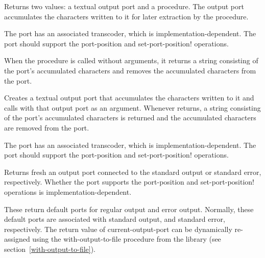 \begin{entry}{%
}

Returns two values: a textual output port and a procedure.
The output port accumulates the characters written to it for
later extraction by the procedure.

The port has an associated transcoder, which is
implementation-dependent.  The port should support the {\cf
  port-position} and {\cf set-port-position!} operations.

When the procedure is called without arguments, it returns a string consisting of the port's
accumulated characters and removes the accumulated characters from the port.
\end{entry}

\begin{entry}{%
}

Creates a textual output port that accumulates the
characters written to it and calls  with that output port
as an argument. Whenever  returns, a string consisting of the
port's accumulated characters is returned and the accumulated characters are
removed from the port.

The port has an associated transcoder, which is implementation-dependent.
The port should support
the {\cf port-position} and {\cf set-port-position!} operations.
\end{entry}

\begin{entry}{%
}
   
Returns fresh an output port connected to the standard output or
standard error, respectively.  Whether the port supports the {\cf
  port-position} and {\cf set-port-position!} operations is
implementation-dependent.
\end{entry}

\begin{entry}{%
}
 
These return default ports for regular output and error output.
Normally, these default ports are associated with standard output, and
standard error, respectively.  The return value of {\cf
  current-output-port} can be dynamically re-assigned using the {\cf
  with-output-to-file} procedure from the 
library (see section~\ref{with-output-to-file}).
\end{entry}


